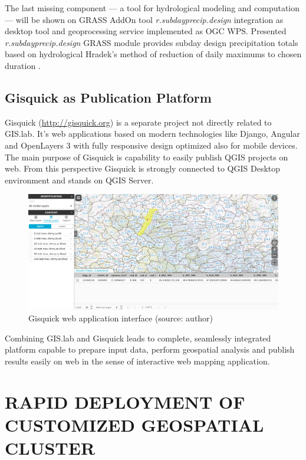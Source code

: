 \documentclass{isprs}
\begin{document}
The last missing component --- a tool for hydrological modeling and
computation --- will be shown on GRASS AddOn tool
\textit{r.subdayprecip.design} integration as desktop tool and
geoprocessing service implemented as OGC WPS. Presented
\textit{r.subdayprecip.design} GRASS module provides subday design
precipitation totals based on hydrological Hradek's method of
reduction of daily maximums to chosen duration
\cite{landa.2015:FOSS4GE2015}.

\subsection{Gisquick as Publication Platform}

Gisquick (\url{http://gisquick.org}) is a separate project not
directly related to GIS.lab. It's web applications based on modern
technologies like Django, Angular and OpenLayers 3 with fully
responsive design optimized also for mobile devices. The main purpose
of Gisquick is capability to easily publish QGIS projects on web. From
this perspective Gisquick is strongly connected to QGIS Desktop
environment and stands on QGIS Server.

\begin{figure}[ht!]
\begin{center}
  \includegraphics[width=0.9\columnwidth]{figures/gisquick-identify.png}
  \caption{Gisquick web application interface
    (source: author)}
\label{fig:gislab_infrastructure}
\end{center}
\end{figure}

Combining GIS.lab and Gisquick leads to complete, seamlessly
integrated platform capable to prepare input data, perform geospatial
analysis and publish results easily on web in the sense of interactive
web mapping application.

\section{RAPID DEPLOYMENT OF CUSTOMIZED GEOSPATIAL CLUSTER}
\end{document}
